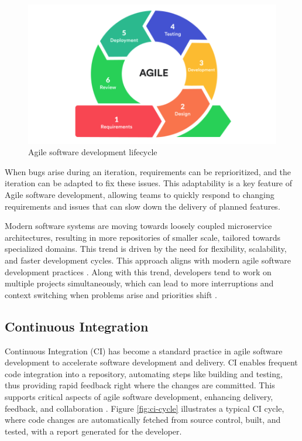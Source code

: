\begin{figure}[H]
    \centering
    \includegraphics[width=1\textwidth]{images/agile-cycle.png}
    \caption{Agile software development lifecycle}
    \label{fig:agile-cycle}
\end{figure}

When bugs arise during an iteration, requirements can be reprioritized, and the iteration can be adapted to fix these issues. This adaptability is a key feature of Agile software development, allowing teams to quickly respond to changing requirements and issues that can slow down the delivery of planned features. %

Modern software systems are moving towards loosely coupled microservice architectures, resulting in more repositories of smaller scale, tailored towards specialized domains. This trend is driven by the need for flexibility, scalability, and faster development cycles. This approach aligns with modern agile software development practices \cite{francescoResearchArchitectingMicroservices2017}. Along with this trend, developers tend to work on multiple projects simultaneously, which can lead to more interruptions and context switching when problems arise and priorities shift \cite{tregubovImpactTaskSwitching2017, vasilescuSkyNotLimit2016}.

\subsection{Continuous Integration}

Continuous Integration (CI) has become a standard practice in agile software development to accelerate software development and delivery. CI enables frequent code integration into a repository, automating steps like building and testing, thus providing rapid feedback right where the changes are committed. This supports critical aspects of agile software development, enhancing delivery, feedback, and collaboration \cite{ugwuezeContinuousIntegrationDeployment2024}. Figure \ref{fig:ci-cycle} illustrates a typical CI cycle, where code changes are automatically fetched from source control, built, and tested, with a report generated for the developer.

